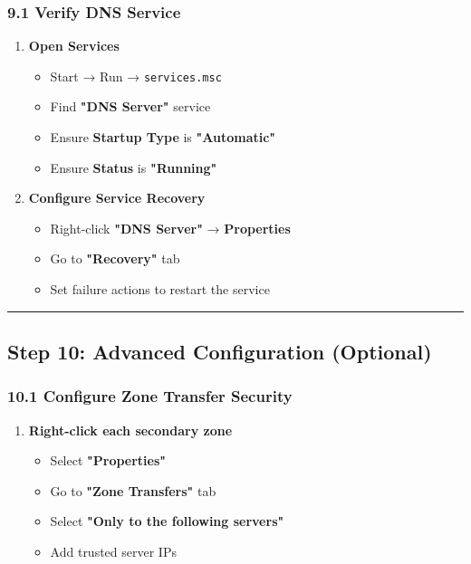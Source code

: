 \subsubsection{9.1 Verify DNS Service}\label{verify-dns-service}

\begin{enumerate}
\def\labelenumi{\arabic{enumi}.}
\tightlist
\item
  \textbf{Open Services}

  \begin{itemize}
  \tightlist
  \item
    Start → Run → \texttt{services.msc}
  \item
    Find \textbf{"DNS Server"} service
  \item
    Ensure \textbf{Startup Type} is \textbf{"Automatic"}
  \item
    Ensure \textbf{Status} is \textbf{"Running"}
  \end{itemize}
\item
  \textbf{Configure Service Recovery}

  \begin{itemize}
  \tightlist
  \item
    Right-click \textbf{"DNS Server"} → \textbf{Properties}
  \item
    Go to \textbf{"Recovery"} tab
  \item
    Set failure actions to restart the service
  \end{itemize}
\end{enumerate}

\begin{center}\rule{0.5\linewidth}{0.5pt}\end{center}

\subsection{Step 10: Advanced Configuration (Optional)}\label{step-10-advanced-configuration-optional}

\subsubsection{10.1 Configure Zone Transfer Security}\label{configure-zone-transfer-security}

\begin{enumerate}
\def\labelenumi{\arabic{enumi}.}
\tightlist
\item
  \textbf{Right-click each secondary zone}

  \begin{itemize}
  \tightlist
  \item
    Select \textbf{"Properties"}
  \item
    Go to \textbf{"Zone Transfers"} tab
  \item
    Select \textbf{"Only to the following servers"}
  \item
    Add trusted server IPs
  \end{itemize}
\end{enumerate}

